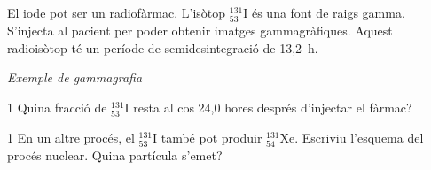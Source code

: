 El iode pot ser un radiofàrmac. L'isòtop $^{131}_{53}\mathrm{I}$ és una font de raigs gamma. S'injecta al pacient per poder obtenir imatges gammagràfiques. Aquest radioisòtop té un període de semidesintegració de 13,2~h.

{\centering\textit{Exemple de gammagrafia}\par}

\begin{apartat}{1}
Quina fracció de $^{131}_{53}\mathrm{I}$ resta al cos 24,0 hores després d'injectar el fàrmac?
\end{apartat}

\begin{apartat}{1}
En un altre procés, el $^{131}_{53}\mathrm{I}$ també pot produir $^{131}_{54}\mathrm{Xe}$. Escriviu l'esquema del procés nuclear. Quina partícula s'emet?
\end{apartat}
